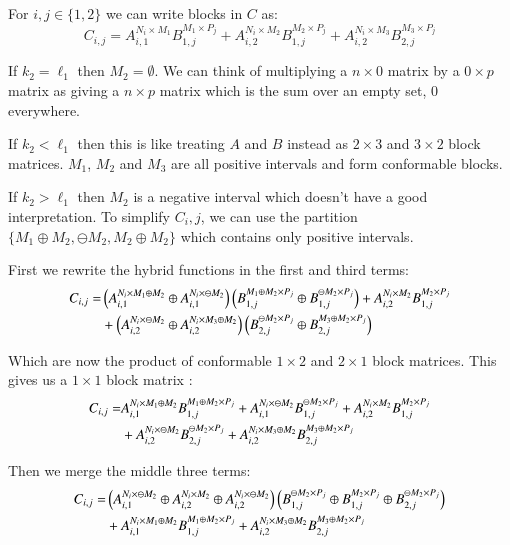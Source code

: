 For $i,j \in \{ 1,2 \}$ we can write blocks in $C$ as:
\begin{equation}
	C_{i,j} 	= A_{i,1}^{N_i \times M_1} B_{1,j}^{M_1 \times P_j} 
			+ A_{i,2}^{N_i \times M_2} B_{1,j}^{M_2 \times P_j}
			+ A_{i,2}^{N_i \times M_3} B_{2,j}^{M_3 \times P_j}
\end{equation}

If $k_2 = \ell_1$ then $M_2 = \emptyset$.
We can think of multiplying a $n \times 0$ matrix by a $0 \times p$ matrix as giving a $n \times p$ matrix which is the sum
over an empty set, 0 everywhere.

If $k_2 < \ell_1$ then this is like treating $A$ and $B$ instead as $2 \times 3$ and $3 \times 2$ block matrices.
$M_1$, $M_2$ and $M_3$ are all positive intervals and form conformable blocks.

If $k_2 > \ell_1$ then $M_2$ is a negative interval which doesn't have a good interpretation.
To simplify $C_i,j$, we can use the partition $ \{ M_1 \oplus M_2, \ominus M_2, M_2 \oplus M_2 \}$ which contains only
positive intervals.


First we rewrite the hybrid functions in the first and third terms:
\begin{align}
	C_{i,j} 	= &\left( A_{i,1}^{N_i \times M_1 \oplus M_2} \oplus A_{i,1}^{N_i \times \ominus M_2} \right)
				\left( B_{1,j}^{M_1 \oplus M_2 \times P_j} \oplus B_{1,j}^{\ominus M_2 \times P_j} \right)
			+ A_{i,2}^{N_i \times M_2} B_{1,j}^{M_2 \times P_j} \notag\\
			&+ \left( A_{i,2}^{N_i \times \ominus M_2} \oplus A_{i,2}^{N_i \times M_3 \oplus M_2} \right)
			 \left( B_{2,j}^{\ominus M_2 \times P_j} \oplus B_{2,j}^{M_3 \oplus M_2 \times P_j} \right)
\end{align}

Which are now the product of conformable $1 \times 2$ and $2 \times 1$ block matrices.
This gives us a $1 \times 1$ block matrix :
\begin{align}
	C_{i,j} 	= & A_{i,1}^{N_i \times M_1 \oplus M_2} B_{1,j}^{M_1 \oplus M_2 \times P_j}
			+ A_{i,1}^{N_i \times \ominus M_2} B_{1,j}^{\ominus M_2 \times P_j}
			+ A_{i,2}^{N_i \times M_2} B_{1,j}^{M_2 \times P_j} \notag\\
			&+ A_{i,2}^{N_i \times \ominus M_2} B_{2,j}^{\ominus M_2 \times P_j}
			+ A_{i,2}^{N_i \times M_3 \oplus M_2} B_{2,j}^{M_3 \oplus M_2 \times P_j}
\end{align}

Then we merge the middle three terms:
\begin{align}
	C_{i,j} 	=& \left( A_{i,1}^{N_i \times \ominus M_2} 
				\oplus  A_{i,2}^{N_i \times M_2} 
				\oplus A_{i,2}^{N_i \times \ominus M_2} \right)
			\left( B_{1,j}^{\ominus M_2 \times P_j} 
				\oplus B_{1,j}^{M_2 \times P_j} 
				\oplus B_{2,j}^{\ominus M_2 \times P_j} \right)\notag\\
			&+ A_{i,1}^{N_i \times M_1 \oplus M_2} B_{1,j}^{M_1 \oplus M_2 \times P_j} 
			+ A_{i,2}^{N_i \times M_3 \oplus M_2} B_{2,j}^{M_3 \oplus M_2 \times P_j} 
\end{align}


